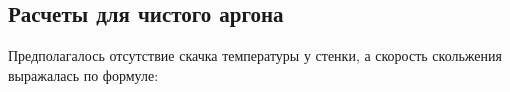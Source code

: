 \documentclass[12pt]{article}
\begin{document}











\subsection{Расчеты для чистого аргона}
Предполагалось отсутствие скачка температуры у стенки, а скорость скольжения выражалась по формуле:
\end{document}
